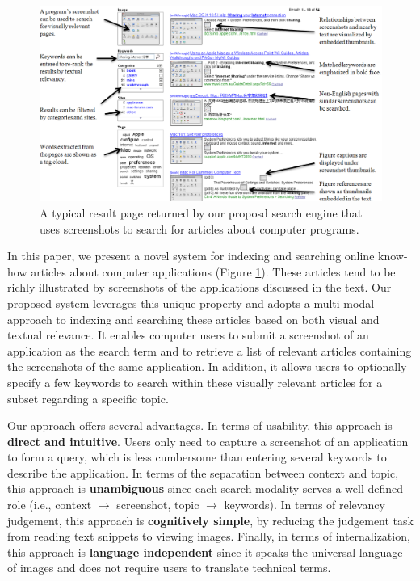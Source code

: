 \documentclass{www2010-submission}
\begin{document}

\begin{figure}
\includegraphics[width=2\columnwidth]{figure/main_result.png}
\caption{A typical result page returned by our
proposd search engine that uses screenshots to search 
for articles about computer programs.}
\label{fig:main_result}
\end{figure}

In this paper, we present a novel system for indexing and searching
online know-how articles about computer applications (Figure
\ref{fig:main_result}).  These articles tend to be richly illustrated
by screenshots of the applications discussed in the text. Our proposed
system leverages this unique property and adopts a multi-modal
approach to indexing and searching these articles based on both visual
and textual relevance.  It enables computer users to submit a
screenshot of an application as the search term and to retrieve a list
of relevant articles containing the screenshots of the same
application. In addition, it allows users to optionally specify a few
keywords to search within these visually relevant articles for a
subset regarding a specific topic.

Our approach offers several advantages. In terms of usability, this
approach is \textbf{direct and intuitive}. Users only need to capture a
screenshot of an application to form a query, which is less cumbersome
than entering several keywords to describe the application. In terms
of the separation between context and topic, this approach is
\textbf{unambiguous} since each search modality serves a well-defined
role (i.e., context $\rightarrow$ screenshot, topic
$\rightarrow$ keywords). In terms of relevancy judgement, this approach 
is \textbf{cognitively simple}, by reducing the judgement task from
reading text snippets to viewing images.  Finally, in terms of
internalization, this approach is \textbf{language independent} since
it speaks the universal language of images and does not require
users to translate technical terms.
\end{document}
